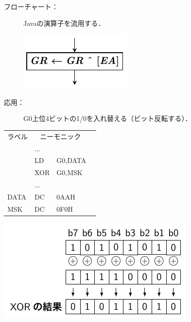 \documentclass[handout]{beamer}        %
\begin{document}
\begin{frame}
  \begin{description}
  \item[フローチャート：] Javaの演算子を流用する．\\
  \vfill
    \centerline{\includegraphics[scale=0.7]{../Tikz/xor_chap5.pdf}}
  \vfill
  \item[応用：] G0上位4ビットの1/0を入れ替える（ビット反転する）．
  \end{description}
  \vfill
  \begin{minipage}{0.48\columnwidth}
    {\ttfamily\small\begin{center}
      \begin{tabular}{|l|l l|l}
        \cline{1-3}
        ラベル & \multicolumn{2}{|c|}{ニーモニック} & \\
        \cline{1-3}
        & ...  &        & \\
        & LD   & G0,DATA& \\
        & XOR  & G0,MSK & \\
        & ...  &        & \\
        DATA& DC   & 0AAH    & \\
        MSK & DC   & 0F0H    & \\
        \cline{1-3}
      \end{tabular}
    \end{center}}
  \end{minipage}
  \begin{minipage}{0.48\columnwidth}
    \centerline{\includegraphics[scale=0.8]{../Tikz/lxor.pdf}}
  \end{minipage}
  \vfill
\end{frame}
\end{document}
